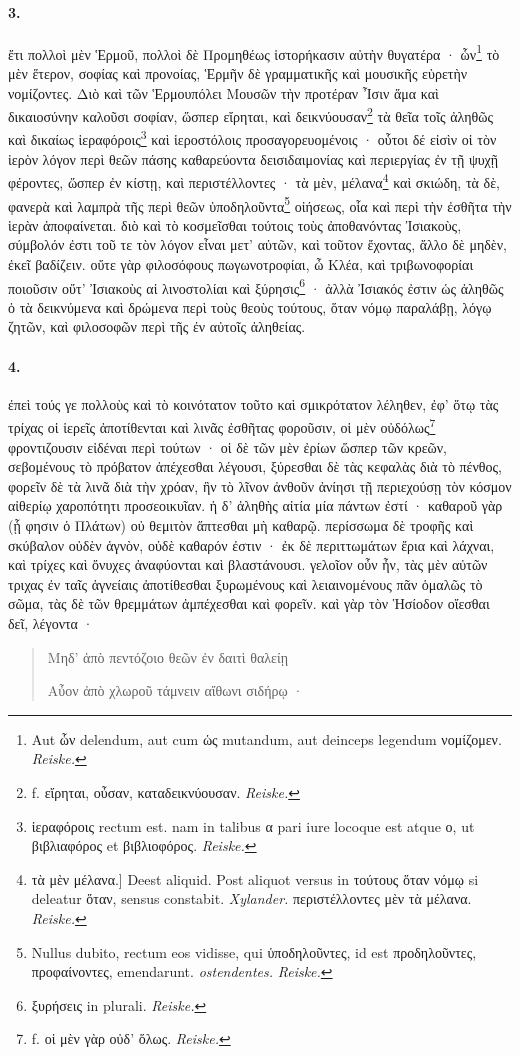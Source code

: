 \documentclass[a4paper, 11pt, oneside, polutonikogreek, german]{article}
\begin{document}
\paragraph{3.}
ἔτι πολλοὶ μὲν Ἑρμοῦ, πολλοὶ δὲ Προμηθέως ἱστορήκασιν αὐτὴν θυγατέρα · ὧν\footnote{Aut ὧν delendum, aut cum ὡς mutandum, aut deinceps legendum νομίζομεν. \emph{Reiske.}} τὸ μὲν ἕτερον, σοφίας καὶ προνοίας, Ἑρμῆν δὲ γραμματικῆς καὶ μουσικῆς εὑρετὴν νομίζοντες. Διὸ καὶ τῶν Ἑρμουπόλει Μουσῶν τὴν προτέραν Ἶσιν ἅμα καὶ δικαιοσύνην καλοῦσι σοφίαν, ὥσπερ εἴρηται, καὶ δεικνύουσαν\footnote{f. εἴρηται, οὖσαν, καταδεικνύουσαν. \emph{Reiske.}} τὰ θεῖα τοῖς ἀληθῶς καὶ δικαίως ἱεραφόροις\footnote{ἱεραφόροις rectum est. nam in talibus α pari iure locoque est atque ο, ut βιβλιαφόρος et βιβλιοφόρος. \emph{Reiske.}} καὶ ἱεροστόλοις προσαγορευομένοις · οὗτοι δέ εἰσὶν οἱ τὸν ἱερὸν λόγον περὶ θεῶν πάσης καθαρεύοντα δεισιδαιμονίας καὶ περιεργίας ἐν τῇ ψυχῇ φέροντες, ὥσπερ ἐν κίστῃ, καὶ περιστέλλοντες · τὰ μὲν, μέλανα\footnote{τὰ μὲν μέλανα.] Deest aliquid. Post aliquot versus in τούτους ὅταν νόμῳ si deleatur ὅταν, sensus constabit. \emph{Xylander.} περιστέλλοντες μὲν τὰ μέλανα. \emph{Reiske.}} καὶ σκιώδη, τὰ δὲ, φανερὰ καὶ λαμπρὰ τῆς περὶ θεῶν ὑποδηλοῦντα\footnote{Nullus dubito, rectum eos vidisse, qui ὑποδηλοῦντες, id est προδηλοῦντες, προφαίνοντες, emendarunt. \emph{ostendentes.} \emph{Reiske.}} οἰήσεως, οἷα καὶ περὶ τὴν ἐσθῆτα τὴν ἱερὰν ἀποφαίνεται. διὸ καὶ τὸ κοσμεῖσθαι τούτοις τοὺς ἀποθανόντας Ἰσιακοὺς, σύμβολόν ἐστι τοῦ τε τὸν λόγον εἶναι μετ' αὐτῶν, καὶ τοῦτον ἔχοντας, ἄλλο δὲ μηδὲν, ἐκεῖ βαδίζειν. οὔτε γὰρ φιλοσόφους πωγωνοτροφίαι, ὦ Κλέα, καὶ τριβωνοφορίαι ποιοῦσιν οὔτ' Ἰσιακοὺς αἱ λινοστολίαι καὶ ξύρησις\footnote{ξυρήσεις in plurali. \emph{Reiske.}} · ἀλλὰ Ἰσιακός ἐστιν ὡς ἀληθῶς ὁ τὰ δεικνύμενα καὶ δρώμενα περὶ τοὺς θεοὺς τούτους, ὅταν νόμῳ παραλάβῃ, λόγῳ ζητῶν, καὶ φιλοσοφῶν περὶ τῆς ἐν αὐτοῖς ἀληθείας.

\paragraph{4.}
ἐπεὶ τούς γε πολλοὺς καὶ τὸ κοινότατον τοῦτο καὶ σμικρότατον λέληθεν, ἐφ' ὅτῳ τὰς τρίχας οἱ ἱερεῖς ἀποτίθενται καὶ λινᾶς ἐσθῆτας φοροῦσιν, οἱ μὲν οὐδόλως\footnote{f. οἱ μὲν γὰρ οὐδ' ὅλως. \emph{Reiske.}} φροντιζουσιν εἰδέναι περὶ τούτων · οἱ δὲ τῶν μὲν ἐρίων ὥσπερ τῶν κρεῶν, σεβομένους τὸ πρόβατον ἀπέχεσθαι λέγουσι, ξύρεσθαι δὲ τὰς κεφαλὰς διὰ τὸ πένθος, φορεῖν δὲ τὰ λινᾶ διὰ τὴν χρόαν, ἣν τὸ λῖνον ἀνθοῦν ἀνίησι τῇ περιεχούσῃ τὸν κόσμον αἰθερίῳ χαροπότητι προσεοικυῖαν. ἡ δ' ἀληθὴς αἰτία μία πάντων ἐστί · καθαροῦ γὰρ (ᾗ φησιν ὁ Πλάτων) οὐ θεμιτὸν ἅπτεσθαι μὴ καθαρῷ. περίσσωμα δὲ τροφῆς καὶ σκύβαλον οὐδὲν ἁγνὸν, οὐδὲ καθαρόν ἐστιν · ἐκ δὲ περιττωμάτων ἔρια καὶ λάχναι, καὶ τρίχες καὶ ὄνυχες ἀναφύονται καὶ βλαστάνουσι. γελοῖον οὖν ἦν, τὰς μὲν αὐτῶν τριχας ἐν ταῖς ἁγνείαις ἀποτίθεσθαι ξυρωμένους καὶ λειαινομένους πᾶν ὁμαλῶς τὸ σῶμα, τὰς δὲ τῶν θρεμμάτων ἀμπέχεσθαι καὶ φορεῖν. καὶ γὰρ τὸν Ἡσίοδον οἴεσθαι δεῖ, λέγοντα ·
\begin{quotation}\tiny
Μηδ' ἀπὸ πεντόζοιο θεῶν ἐν δαιτὶ θαλείῃ

Αὖον ἀπὸ χλωροῦ τάμνειν αἴθωνι σιδήρῳ ·
\end{quotation}
\end{document}
